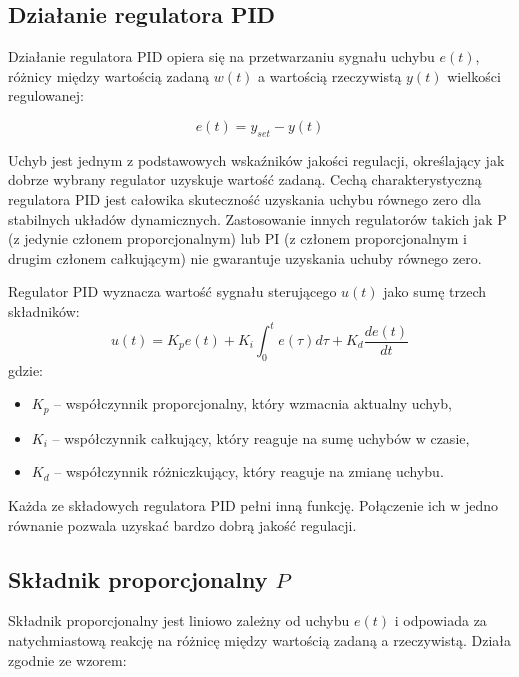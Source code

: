 \subsection{Działanie regulatora PID}

Działanie regulatora PID opiera się na przetwarzaniu sygnału uchybu $e(t)$, różnicy między wartością zadaną $w(t)$ a wartością rzeczywistą $y(t)$ wielkości regulowanej:

\begin{equation}
e(t) = y_{set} - y(t)
\end{equation}

Uchyb jest jednym z podstawowych wskaźników jakości regulacji, określający jak dobrze wybrany regulator uzyskuje wartość zadaną. Cechą charakterystyczną regulatora PID jest całowika skuteczność uzyskania uchybu równego zero dla stabilnych układów dynamicznych. Zastosowanie innych regulatorów takich jak P (z jedynie członem proporcjonalnym) lub PI (z członem proporcjonalnym i drugim 
członem całkującym) nie gwarantuje uzyskania uchuby równego zero. 

\hspace{1cm}

Regulator PID wyznacza wartość sygnału sterującego $u(t)$ jako sumę trzech składników:
\begin{equation}
u(t) = K_p e(t) + K_i \int_{0}^{t} e(\tau) d\tau + K_d \frac{de(t)}{dt}
\end{equation}
gdzie:
\begin{itemize}
    \item $K_p$ – współczynnik proporcjonalny, który wzmacnia aktualny uchyb,
    \item $K_i$ – współczynnik całkujący, który reaguje na sumę uchybów w czasie,
    \item $K_d$ – współczynnik różniczkujący, który reaguje na zmianę uchybu.
\end{itemize}

Każda ze składowych regulatora PID pełni inną funkcję. Połączenie ich w jedno równanie pozwala uzyskać bardzo dobrą jakość regulacji. 

\subsection{Składnik proporcjonalny $P$}

Składnik proporcjonalny jest liniowo zależny od uchybu $e(t)$ i odpowiada za natychmiastową reakcję na różnicę między wartością zadaną a rzeczywistą. Działa zgodnie ze wzorem:

